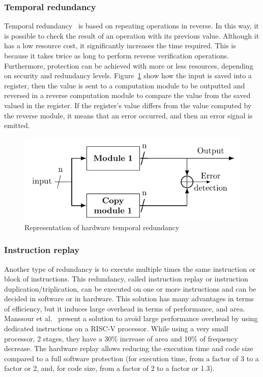 \subsubsection{Temporal redundancy}
Temporal redundancy~\cite{RBMK-10-host, MVL-07-fdtc, GK-13-tcad}  is based on repeating operations in reverse. In this way, it is possible to check the result of an operation with its previous value. Although it has a low resource cost, it significantly increases the time required. This is because it takes twice as long to perform reverse verification operations. Furthermore, protection can be achieved with more or less resources, depending on security and redundancy levels. Figure~\ref{fig:temporal_redundancy} show how the input is saved into a register, then the value is sent to a computation module to be outputted and reversed in a reverse computation module to compare the value from the saved valued in the register. If the register's value differs from the value computed by the reverse module, it means that an error occurred, and then an error signal is emitted.

\begin{figure}[ht]
    \centering
    \includegraphics[page=2]{c2_soa/img/redundancy.pdf}
    \caption{Representation of hardware temporal redundancy}
    \label{fig:temporal_redundancy}
\end{figure}

\subsubsection{Instruction replay}
Another type of redundancy is to execute multiple times the same instruction or block of instructions. This redundancy, called instruction replay or instruction duplication/triplication, can be executed on one or more instructions and can be decided in software or in hardware. This solution has many advantages in terms of efficiency, but it induces large overhead in terms of performance, and area.
Manssour et al.~\cite{NLGT-22-ddecs} present a solution to avoid large performance overhead by using dedicated instructions on a RISC-V processor. While using a very small processor, 2 stages, they have a 30\% increase of area and 10\% of frequency decrease. The hardware replay allows reducing the execution time and code size compared to a full software protection (for execution time, from a factor of 3 to a factor or 2, and, for code size, from a factor of 2 to a factor or 1.3).

